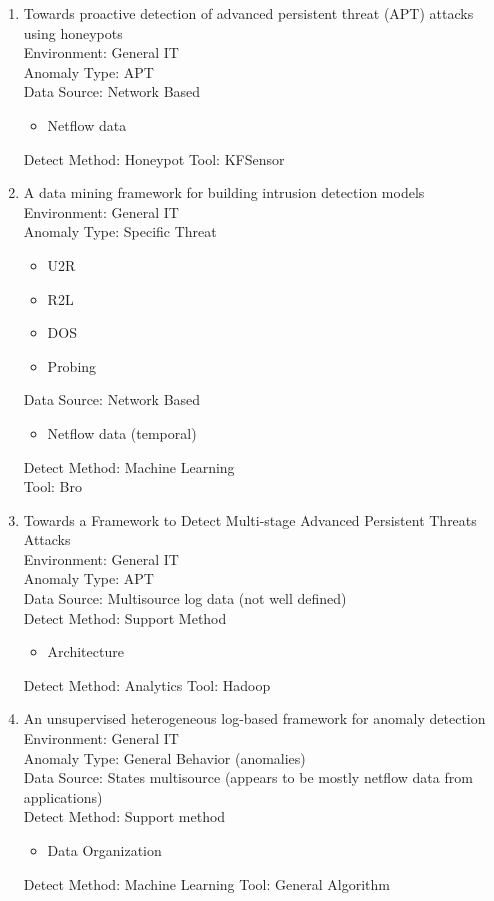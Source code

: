 \begin{enumerate}
    \item
    Towards proactive detection of advanced persistent threat (APT) attacks using honeypots\cite{saud2015towards}\\
    Environment: General IT\\
    Anomaly Type: APT \\
    Data Source: Network Based
    \begin{itemize}
        \item Netflow data
    \end{itemize}
    Detect Method: Honeypot
    Tool: KFSensor
    
    \item
    A data mining framework for building intrusion detection models\cite{lee1999data}\\
    Environment: General IT\\
    Anomaly Type: Specific Threat
    \begin{itemize}
        \item U2R
        \item R2L
        \item DOS
        \item Probing
    \end{itemize}
    Data Source: Network Based
    \begin{itemize}
        \item Netflow data (temporal)
    \end{itemize}
    Detect Method: Machine Learning  \\
    Tool: Bro
    
    \item
    Towards a Framework to Detect Multi-stage Advanced Persistent Threats Attacks\cite{bhatt2014towards}\\
    Environment: General IT\\
    Anomaly Type:  APT\\
    Data Source:  Multisource log data (not well defined)\\
    Detect Method: Support Method
    \begin{itemize}
        \item Architecture
    \end{itemize}
    Detect Method: Analytics
    Tool: Hadoop
    
    \item
    An unsupervised heterogeneous log-based framework for anomaly detection\cite{hajamydeen2016unsupervised}\\
    Environment: General IT\\
    Anomaly Type: General Behavior (anomalies)\\
    Data Source: States multisource (appears to be mostly netflow data from applications)  \\
    Detect Method: Support method 
    \begin{itemize}
        \item Data Organization
    \end{itemize}
    Detect Method: Machine Learning
    Tool: General Algorithm
    

\end{enumerate}
